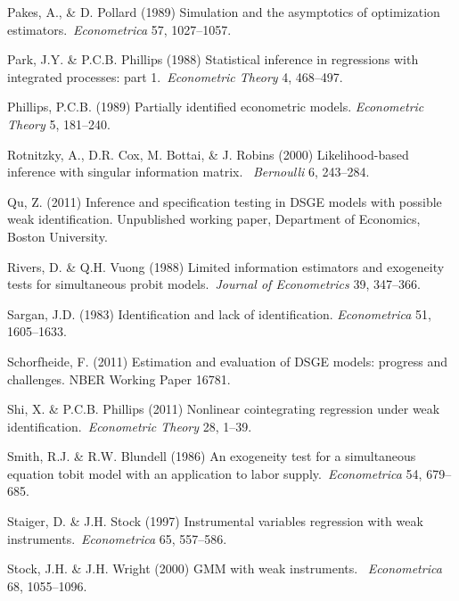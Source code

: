 \documentclass[12pt,titlepage,final,oneside,letterpaper]{article}
\begin{document}
\begin{description}
\item Pakes, A., \& D. Pollard (1989) Simulation and the asymptotics of
optimization estimators.\ \emph{Econometrica} 57, 1027--1057.

\item Park, J.Y. \& P.C.B. Phillips (1988) Statistical inference in
regressions with integrated processes: part 1.\ \emph{Econometric Theory }4,
468--497.

\item Phillips, P.C.B. (1989) Partially identified econometric models. \emph{%
Econometric Theory} 5, 181--240.

\item Rotnitzky, A., D.R. Cox, M. Bottai, \& J. Robins (2000)
Likelihood-based inference with singular information matrix.\ \emph{%
Bernoulli }6, 243--284.

\item Qu, Z. (2011) Inference and specification testing in DSGE models with
possible weak identification. Unpublished working paper, Department of
Economics, Boston University.

\item Rivers, D. \& Q.H. Vuong (1988) Limited information estimators and
exogeneity tests for simultaneous probit models.\ \emph{Journal of
Econometrics }39, 347--366.

\item Sargan, J.D. (1983) Identification and lack of identification. \emph{%
Econometrica} 51, 1605--1633.

\item Schorfheide, F. (2011) Estimation and evaluation of DSGE models:
progress and challenges. NBER Working Paper 16781.

\item Shi, X. \& P.C.B. Phillips (2011) Nonlinear cointegrating regression
under weak identification.\ \emph{Econometric Theory} 28, 1--39.

\item Smith, R.J. \& R.W. Blundell (1986) An exogeneity test for a
simultaneous equation tobit model with an application to labor supply.\ 
\emph{Econometrica} 54, 679--685.

\item Staiger, D. \& J.H. Stock (1997) Instrumental variables regression
with weak instruments.\ \emph{Econometrica} 65, 557--586.

\item Stock, J.H. \& J.H. Wright (2000) GMM with weak instruments.\ \emph{%
Econometrica }68, 1055--1096.\newpage 
\end{description}
\end{document}
